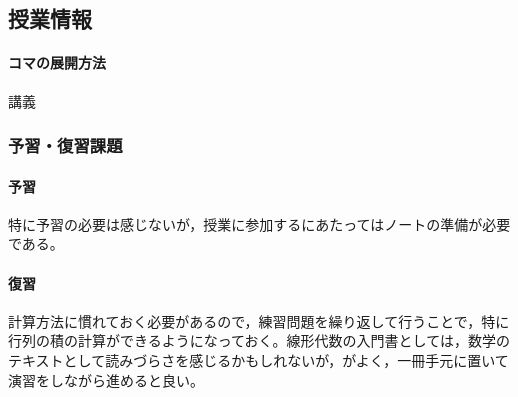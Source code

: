 \subsection{授業情報}
\paragraph{コマの展開方法}
講義
\subsubsection{予習・復習課題}
\paragraph{予習}特に予習の必要は感じないが，授業に参加するにあたってはノートの準備が必要である。
\paragraph{復習}計算方法に慣れておく必要があるので，練習問題を繰り返して行うことで，特に行列の積の計算ができるようになっておく。線形代数の入門書としては，数学のテキストとして読みづらさを感じるかもしれないが，\citet{村上正康2016-03-01}がよく，一冊手元に置いて演習をしながら進めると良い。
